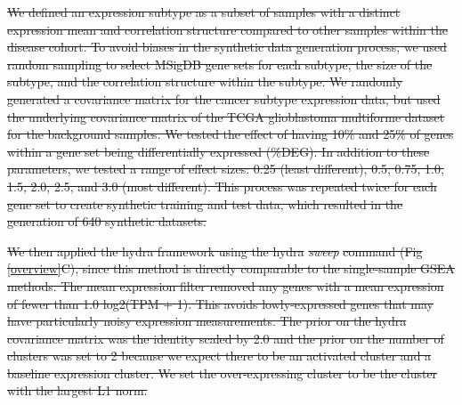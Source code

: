 \documentclass[10pt,letterpaper]{article}
\providecommand{\DIFdeltex}[1]{{\protect\color{red}\sout{#1}}}                      %
\providecommand{\DIFdel}[1]{\texorpdfstring{\DIFdeltex{#1}}{}} %
\begin{document}
\DIFdel{We defined an expression subtype as a subset of samples with a distinct expression mean and correlation structure compared to other samples within the disease cohort. To avoid biases in the synthetic data generation process, we used random sampling to select MSigDB gene sets for each subtype, the size of the subtype, and the correlation structure within the subtype. We randomly generated a covariance matrix for the cancer subtype expression data, but used the underlying covariance matrix of the TCGA glioblastoma multiforme dataset for the background samples. We tested the effect of having 10\% and 25\% of genes within a gene set being differentially expressed (\%DEG). In addition to these parameters, we tested a range of effect sizes: 0.25 (least different), 0.5, 0.75, 1.0, 1.5, 2.0, 2.5, and 3.0 (most different). This process was repeated twice for each gene set to create synthetic training and test data, which resulted in the generation of 640 synthetic datasets.
}%

\DIFdel{We then applied the hydra framework using the hydra }\textit{\DIFdel{sweep}} %
\DIFdel{command (Fig \ref{overview}C), since this method is directly comparable to the single-sample GSEA methods. The mean expression filter removed any genes with a mean expression of fewer than 1.0 log2(TPM + 1). This avoids lowly-expressed genes that may have particularly noisy expression measurements. The prior on the hydra covariance matrix was the identity scaled by 2.0 and the prior on the number of clusters was set to 2 because we expect there to be an activated cluster and a baseline expression cluster. We set the over-expressing cluster to be the cluster with the largest L1 norm.
}%


\end{document}
